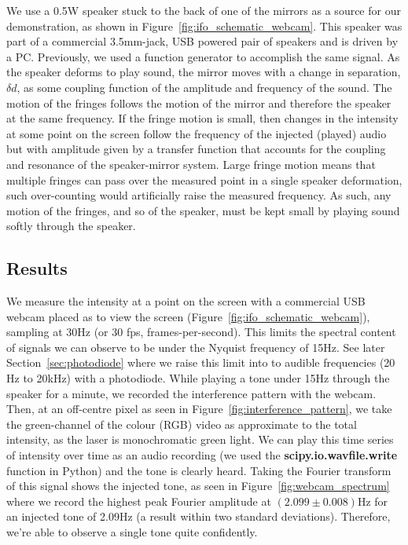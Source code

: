 \documentclass[prb,preprint]{revtex4-1}
\begin{document}
We use a 0.5W speaker stuck to the back of one of the mirrors as a source for our demonstration, as shown in Figure~\ref{fig:ifo_schematic_webcam}. This speaker was part of a commercial 3.5mm-jack, USB powered pair of speakers and is driven by a PC. Previously, we used a function generator to accomplish the same signal.
As the speaker deforms to play sound, the mirror moves with a change in separation, $\delta d$, as some coupling function of the amplitude and frequency of the sound. The motion of the fringes follows the motion of the mirror and therefore the speaker at the same frequency.
If the fringe motion is small, then changes in the intensity at some point on the screen follow the frequency of the injected (played) audio but with amplitude given by a transfer function that accounts for the coupling and resonance of the speaker-mirror system.
Large fringe motion means that multiple fringes can pass over the measured point in a single speaker deformation, such over-counting would artificially raise the measured frequency. As such, any motion of the fringes, and so of the speaker, must be kept small by playing sound softly through the speaker.


\subsection{Results}

We measure the intensity at a point on the screen with a commercial USB webcam placed as to view the screen (Figure~\ref{fig:ifo_schematic_webcam}), sampling at 30Hz (or 30 fps, frames-per-second). This limits the spectral content of signals we can observe to be under the Nyquist frequency of 15Hz.
See later Section~\ref{sec:photodiode} where we raise this limit into to audible frequencies (20 Hz to 20kHz) with a photodiode.
While playing a tone under 15Hz through the speaker for a minute, we recorded the interference pattern with the webcam. Then, at an off-centre pixel as seen in Figure~\ref{fig:interference_pattern}, we take the green-channel of the colour (RGB) video as approximate to the total intensity, as the laser is monochromatic green light. We can play this time series of intensity over time as an audio recording (we used the \textbf{scipy.io.wavfile.write}\cite{scipy} function in Python\cite{python}) and the tone is clearly heard.
Taking the Fourier transform of this signal shows the injected tone, as seen in Figure~\ref{fig:webcam_spectrum} where we record the highest peak Fourier amplitude at $(2.099\pm 0.008)\mathrm{Hz}$ for an injected tone of 2.09Hz (a result within two standard deviations).
Therefore, we’re able to observe a single tone quite confidently.
\end{document}
